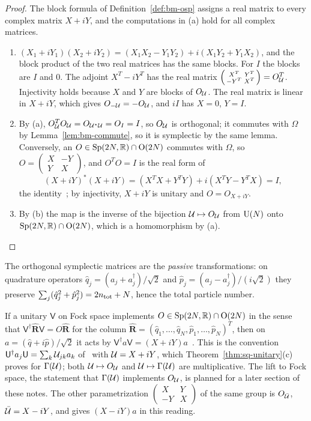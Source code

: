 \begin{vetdenv}
\begin{proof}
The block formula of Definition~\ref{def:bm-osp} assigns a real matrix to every complex matrix $X+iY$, and the
computations in (a) hold for all complex matrices.
\begin{enumerate}
\item[(a)] $(X_1+iY_1)(X_2+iY_2)=(X_1X_2-Y_1Y_2)+i(X_1Y_2+Y_1X_2)$, and the block product of the two real matrices has
the same blocks. For $I$ the blocks are $I$ and $0$. The adjoint $X^T-iY^T$ has the real matrix
$\left(\begin{smallmatrix}X^T&Y^T\\-Y^T&X^T\end{smallmatrix}\right)=O_\mathcal U^T$. Injectivity holds because $X$ and $Y$ are
blocks of $O_\mathcal U$. The real matrix is linear in $X+iY$, which gives $O_{-\mathcal U}=-O_\mathcal U$, and $iI$ has $X=0$, $Y=I$.
\item[(b)] By (a), $O_\mathcal U^TO_\mathcal U=O_{\mathcal U^*\mathcal U}=O_I=I$, so $O_\mathcal U$ is orthogonal; it commutes with $\Omega$ by
Lemma~\ref{lem:bm-commute}, so it is symplectic by the same lemma. Conversely, an $O\in\mathrm{Sp}(2N,\mathbb R)\cap\mathrm{O}(2N)$ commutes with $\Omega$,
so $O=\left(\begin{smallmatrix}X&-Y\\Y&X\end{smallmatrix}\right)$, and $O^TO=I$ is the real form of
\[
 (X+iY)^*(X+iY)=(X^TX+Y^TY)+i(X^TY-Y^TX)=I,
\]
the identity~\cite[(A15), (A16)]{tjoacirac}; by injectivity, $X+iY$ is unitary and $O=O_{X+iY}$.
\item[(c)] By (b) the map is the inverse of the bijection $\mathcal U\mapsto O_\mathcal U$ from $\mathrm{U}(N)$ onto $\mathrm{Sp}(2N,\mathbb R)\cap\mathrm{O}(2N)$, which is a
homomorphism by (a).\qedhere
\end{enumerate}
\end{proof}

The orthogonal symplectic matrices are the \emph{passive} transformations: on quadrature operators
$\hat q_j=(a_j+a_j^\dagger)/\sqrt2$ and $\hat p_j=(a_j-a_j^\dagger)/(i\sqrt2)$ they preserve
$\sum_j(\hat q_j^2+\hat p_j^2)=2n_{\mathrm{tot}}+N$, hence the total particle number.

If a unitary $\mathsf V$ on Fock space
implements $O\in\mathrm{Sp}(2N,\mathbb R)\cap\mathrm{O}(2N)$ in the sense that $\mathsf V^\dagger\hat{\mathbf R}\mathsf V=O\hat{\mathbf R}$ for the column
$\hat{\mathbf R}=(\hat q_1,\ldots,\hat q_N,\hat p_1,\ldots,\hat p_N)^T$, then on $a=(\hat q+i\hat p)/\sqrt2$ it acts by
$\mathsf V^\dagger a\mathsf V=(X+iY)a$~\cite[(A17)--(A19)]{tjoacirac}. This is the convention $\mathsf U^\dagger a_j\mathsf U=
\sum_k\mathcal U_{jk}a_k$ of~\cite[(29), (A26)]{tjoacirac} with $\mathcal U=X+iY$, which Theorem~\ref{thm:sq-unitary}(c) proves for
$\Gamma(\mathcal U)$; both $\mathcal U\mapsto O_\mathcal U$ and $\mathcal U\mapsto\Gamma(\mathcal U)$ are multiplicative. The lift to Fock
space, the statement that $\Gamma(\mathcal U)$ implements $O_\mathcal U$, is planned for a later section of these notes. The other parametrization
$\left(\begin{smallmatrix}X&Y\\-Y&X\end{smallmatrix}\right)$ of the same group is $O_{\bar{\mathcal U}}$, $\bar{\mathcal U}=X-iY$, and
gives $(X-iY)a$ in this reading.


\end{vetdenv}
